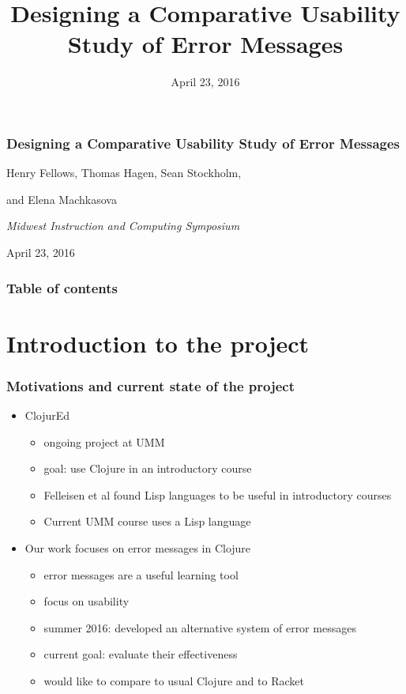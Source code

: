 \documentclass{beamer}
\begin{document}
\title{Designing a Comparative Usability Study of Error Messages}
\date{April 23, 2016}

\begin{frame}
\frametitle{Designing a Comparative Usability Study of Error Messages}
{\centering
\noindent
Henry Fellows, Thomas Hagen, Sean Stockholm, \par
and Elena Machkasova \par

{\it 
Midwest Instruction and Computing Symposium\par
April 23, 2016\par}
}
\end{frame}

\begin{frame}
\frametitle{Table of contents}
\tableofcontents  
\end{frame}

\section{Introduction to the project}

\begin{frame}
\frametitle{Motivations and current state of the project}
	\begin{itemize}
		\item ClojurEd
			\begin{itemize}
				\item ongoing project at UMM
				\item goal: use Clojure in an introductory course
				\item Felleisen et al found Lisp languages to be useful in introductory courses
				\item Current UMM course uses a Lisp language 
			\end{itemize}
		\item Our work focuses on error messages in Clojure
			\begin{itemize}
				\item error messages are a useful learning tool
				\item focus on usability
				\item summer 2016: developed an alternative system of error messages
				\item current goal: evaluate their effectiveness
				\item would like to compare to usual Clojure and to Racket
			\end{itemize}
	\end{itemize}
\end{frame}
\end{document}
